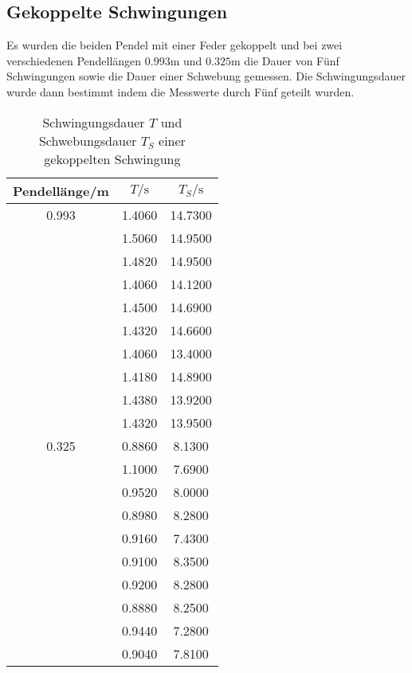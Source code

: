   \subsection{Gekoppelte Schwingungen}
    Es wurden die beiden Pendel mit einer Feder gekoppelt und bei zwei verschiedenen Pendellängen $0.993$m und $0.325$m die Dauer
    von Fünf Schwingungen sowie die Dauer einer Schwebung gemessen. Die Schwingungsdauer wurde dann bestimmt indem die Messwerte
    durch Fünf geteilt wurden.
    \begin{table}
      \centering
        \caption{Schwingungsdauer $T$ und Schwebungsdauer $T_{S}$ einer gekoppelten Schwingung}
        \label{tab:aufgabe4}
        \begin{tabular}{S S S}
          \toprule
          {Pendellänge/m} & {$T/\si{\second}$} & {$T_{S}/\si{\second}$} \\
             &   1.4060 &     14.7300 \\
                  &   1.5060 &     14.9500 \\
                  &   1.4820 &     14.9500 \\
                  &   1.4060 &     14.1200 \\
                  &   1.4500 &     14.6900 \\
                  &   1.4320 &     14.6600 \\
                  &   1.4060 &     13.4000 \\
                  &   1.4180 &     14.8900 \\
                  &   1.4380 &     13.9200 \\
                  &   1.4320 &     13.9500 \\
          0.325   &   0.8860 &     8.1300 \\
                  &   1.1000 &     7.6900 \\
                  &   0.9520 &     8.0000 \\
                  &   0.8980 &     8.2800 \\
                  &   0.9160 &     7.4300 \\
                  &   0.9100 &     8.3500 \\
                  &   0.9200 &     8.2800 \\
                  &   0.8880 &     8.2500 \\
                  &   0.9440 &     7.2800 \\
                  &   0.9040 &     7.8100 \\
          \bottomrule
        \end{tabular}
      \end{table}
    \newpage
